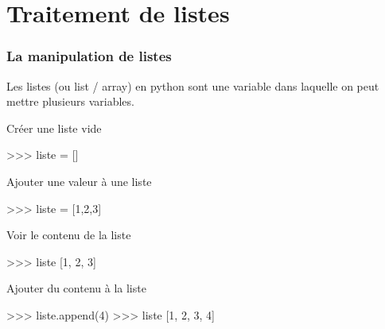 

\section{Traitement de listes} 

\begin{frame}[fragile]
\frametitle{La manipulation de listes}

Les listes (ou list / array) en python sont une variable dans laquelle on peut mettre plusieurs variables.

\begin{minipage}[t]{0.38\linewidth}
Créer une liste vide
\end{minipage}\hfill
\begin{minipage}[t]{0.58\linewidth}
\vspace{-0.5cm}
\begin{GrayBox}[0.85\textwidth]
\begin{verbatimtab}[3]
>>> liste = []
\end{verbatimtab}
\end{GrayBox}
\end{minipage}


\begin{minipage}[t]{0.38\linewidth}
Ajouter une valeur à une liste
\end{minipage}\hfill
\begin{minipage}[t]{0.58\linewidth}
\vspace{-0.5cm}
\begin{GrayBox}[0.85\textwidth]
\begin{verbatimtab}[3]
>>> liste = [1,2,3]
\end{verbatimtab}
\end{GrayBox}
\end{minipage}

\begin{minipage}[t]{0.38\linewidth}
Voir le contenu de la liste
\end{minipage}\hfill
\begin{minipage}[t]{0.58\linewidth}
\vspace{-0.5cm}
\begin{GrayBox}[0.85\textwidth]
\begin{verbatimtab}[3]
>>> liste
[1, 2, 3]
\end{verbatimtab}
\end{GrayBox}
\end{minipage}

\begin{minipage}[t]{0.38\linewidth}
Ajouter du contenu à la liste
\end{minipage}\hfill
\begin{minipage}[t]{0.58\linewidth}
\vspace{-0.5cm}
\begin{GrayBox}[0.85\textwidth]
\begin{verbatimtab}[3]
>>> liste.append(4)
>>> liste
[1, 2, 3, 4]
\end{verbatimtab}
\end{GrayBox}
\end{minipage}
\end{frame}

